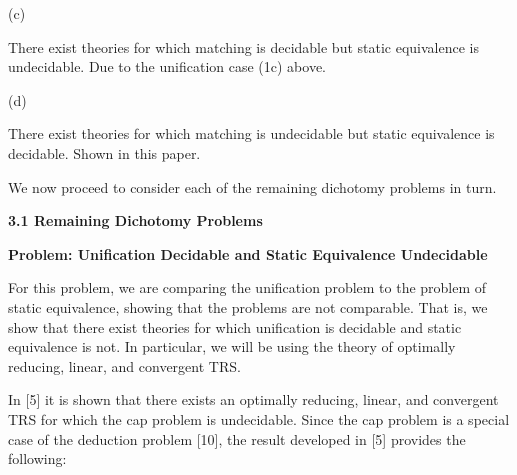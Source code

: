  
 
\par\noindent  (c) 
 
There exist theories for which matching is decidable but static equivalence is undecidable. Due to the unification case (1c) above.\par
 
 
 
\par\noindent  (d) 
 
There exist theories for which matching is undecidable but static equivalence is decidable. Shown in this paper.\par
 
 
  
 
  
 
 
We now proceed to consider each of the remaining dichotomy problems in turn.\par
 
 
 
\par\medskip\noindent\textbf{3.1 Remaining Dichotomy Problems}\par
 
 
\par\medskip\noindent\textbf{Problem: Unification Decidable and Static Equivalence Undecidable}\par
 
 
For this problem, we are comparing the unification problem to the problem of static equivalence, showing that the problems are not comparable. That is, we show that there exist theories for which unification is decidable and static equivalence is not. In particular, we will be using the theory of optimally reducing, linear, and convergent TRS.\par
 
 
 
In [5] it is shown that there exists an optimally reducing, linear, and convergent TRS for which the cap problem is undecidable. Since the cap problem is a special case of the deduction problem [10], the result developed in [5] provides the following:\par
 
